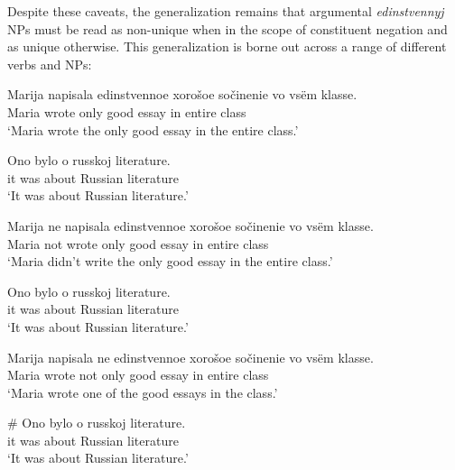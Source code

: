 \begin{exe}
\end{exe}

Despite these caveats, the generalization remains that argumental \textit{edinstvennyj} NPs must be read as non-unique when in the scope of constituent negation and as unique otherwise. This generalization is borne out across a range of different verbs and NPs:

\begin{exe}
	\ex \begin{xlist}
		\ex \gll Marija napisala edinstvennoe xoro\v{s}oe so\v{c}inenie vo vs\"{e}m klasse.\\
		Maria wrote only good essay in entire class\\
		\glt `Maria wrote the only good essay in the entire class.'

		\ex \gll Ono bylo o russkoj literature.\\
		it was about Russian literature\\
		\glt `It was about Russian literature.'
	\end{xlist}

	\ex \begin{xlist}
		\ex \gll Marija ne napisala edinstvennoe xoro\v{s}oe so\v{c}inenie vo vs\"{e}m klasse.\\
		Maria not wrote only good essay in entire class\\
		\glt `Maria didn't write the only good essay in the entire class.'

		\ex \gll Ono bylo o russkoj literature.\\
		it was about Russian literature\\
		\glt `It was about Russian literature.'
	\end{xlist}

	\ex \label{maria3} \begin{xlist}
		\ex \gll Marija napisala ne edinstvennoe xoro\v{s}oe so\v{c}inenie vo vs\"{e}m klasse.\\
		Maria wrote not only good essay in entire class\\
		\glt `Maria wrote one of the good essays in the class.'

		\ex \gll \# Ono bylo o russkoj literature.\\
		{} it was about Russian literature\\
		\glt `It was about Russian literature.'
	\end{xlist}
\end{exe}

